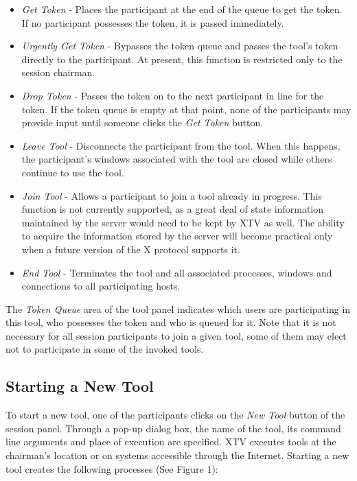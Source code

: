 \begin{itemize}

\item {\it Get Token} - Places the participant at the end of the queue
to get the token.  If no participant possesses the token, it is passed
immediately.

\item {\it Urgently Get Token} - Bypasses the token queue and passes
the tool's token directly to the participant.  At present, this
function is restricted only to the session chairman.


\item {\it Drop Token} - Passes the token on to the next participant in
line for the token.  If the token queue is empty at that point, none of
the participants may provide input until someone clicks the {\it Get
Token} button.

\item {\it Leave Tool} - Disconnects the participant from the tool.
When this happens, the participant's windows associated with
the tool  are closed while others continue to use the tool.

\item {\it Join Tool} - Allows a participant to join a tool already in
progress.  This function is not currently supported, as a great deal of
state information maintained by the server would need to be kept by XTV
as well.  The ability to acquire the information stored by the server
will become practical only when a future version of the X protocol
supports it.

\item {\it End Tool} - Terminates the tool and all associated
processes, windows and connections to all participating hosts.

\end{itemize}

The {\it Token Queue} area of the tool panel indicates which users are
participating in this tool, who possesses the token and who is queued
for it.
Note that it is not necessary for all session participants to join a
given tool, some of them may elect not to participate in some of the
invoked tools.


%
%
\subsection{Starting a New Tool}

To start a new tool, one of the participants clicks on the {\it New
Tool} button of the session panel.  Through a pop-up dialog box,
the name of the tool, its command line arguments and
place of execution are specified.  XTV executes tools
at the chairman's location or on systems accessible through the Internet.
Starting a new tool creates the following processes (See Figure 1):

